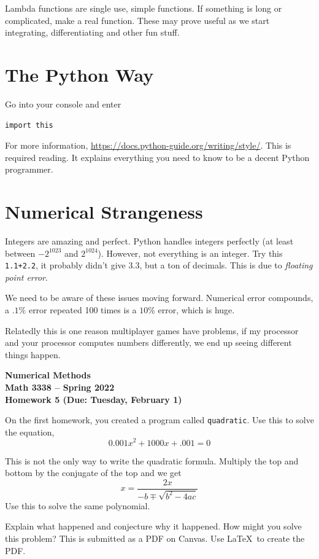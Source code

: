 \documentclass[11pt,letterpaper]{article}
\newcommand{\semester}{Spring 2022}
\newcommand{\due}{Tuesday, February 1}
\begin{document}
Lambda functions are single use, simple functions. If something is long or complicated, make a real
function. These may prove useful as we start integrating, differentiating and other fun stuff.



\section{The Python Way}
Go into your console and enter
\begin{verbatim}
import this
\end{verbatim}

For more information, \url{https://docs.python-guide.org/writing/style/}. This is required reading.
It explains everything you need to know to be a decent Python programmer.

\section{Numerical Strangeness}
Integers are amazing and perfect. Python handles integers perfectly (at least between $-2^{1023}$
and $2^{1024}$). However, not everything is an integer. Try this \texttt{1.1+2.2}, it probably 
didn't give $3.3$, but a ton of decimals. This is due to \emph{floating point error}.


We need to be aware of these issues moving forward. Numerical error compounds, a $.1\%$ error
repeated 100 times is a $10\%$ error, which is huge.

Relatedly this is one reason multiplayer games have problems, if my processor and your processor 
computes numbers differently, we end up seeing different things happen.


\newpage

\begin{center}
{\huge{\bf  Numerical Methods}} \\[1.5ex]
{\bf Math 3338 -- \semester}\\[1.5ex]
{\Large{\bf Homework 5 (Due: \due)}}\\
\end{center}
\vspace{2mm}

\begin{problem}
On the first homework, you created a program called \texttt{quadratic}. Use this to solve the 
equation, 
\[
0.001x^2+1000x+.001=0
\]

This is not the only way to write the quadratic formula. Multiply the top and bottom by the conjugate
of the top and we get
\[
x = \frac{2x}{-b\mp\sqrt{b^2-4ac}}
\]
Use this to solve the same polynomial. 

Explain what happened and conjecture why it happened. How might you solve this problem? This is 
submitted as a PDF on Canvas. Use \LaTeX\ to create the PDF.
\end{problem}
\end{document}
